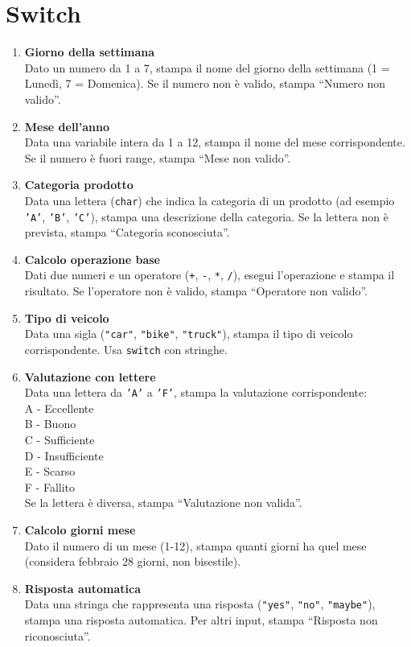 \documentclass{article}
\begin{document}
\section{Switch}

\begin{enumerate}
    \item \textbf{Giorno della settimana} \\
    Dato un numero da 1 a 7, stampa il nome del giorno della settimana (1 = Lunedì, 7 = Domenica). Se il numero non è valido, stampa ``Numero non valido''.
    
    \item \textbf{Mese dell'anno} \\
    Data una variabile intera da 1 a 12, stampa il nome del mese corrispondente. Se il numero è fuori range, stampa ``Mese non valido''.
    
    \item \textbf{Categoria prodotto} \\
    Data una lettera (\texttt{char}) che indica la categoria di un prodotto (ad esempio \texttt{'A'}, \texttt{'B'}, \texttt{'C'}), stampa una descrizione della categoria. Se la lettera non è prevista, stampa ``Categoria sconosciuta''.
    
    \item \textbf{Calcolo operazione base} \\
    Dati due numeri e un operatore (\texttt{+}, \texttt{-}, \texttt{*}, \texttt{/}), esegui l'operazione e stampa il risultato. Se l'operatore non è valido, stampa ``Operatore non valido''.
    
    \item \textbf{Tipo di veicolo} \\
    Data una sigla (\texttt{"car"}, \texttt{"bike"}, \texttt{"truck"}), stampa il tipo di veicolo corrispondente. Usa \texttt{switch} con stringhe.
    
    \item \textbf{Valutazione con lettere} \\
    Data una lettera da \texttt{'A'} a \texttt{'F'}, stampa la valutazione corrispondente: \\
    \quad A - Eccellente \\
    \quad B - Buono \\
    \quad C - Sufficiente \\
    \quad D - Insufficiente \\
    \quad E - Scarso \\
    \quad F - Fallito \\
    Se la lettera è diversa, stampa ``Valutazione non valida''.
    
    \item \textbf{Calcolo giorni mese} \\
    Dato il numero di un mese (1-12), stampa quanti giorni ha quel mese (considera febbraio 28 giorni, non bisestile).
    
    \item \textbf{Risposta automatica} \\
    Data una stringa che rappresenta una risposta (\texttt{"yes"}, \texttt{"no"}, \texttt{"maybe"}), stampa una risposta automatica. Per altri input, stampa ``Risposta non riconosciuta''.
\end{enumerate}
\end{document}
